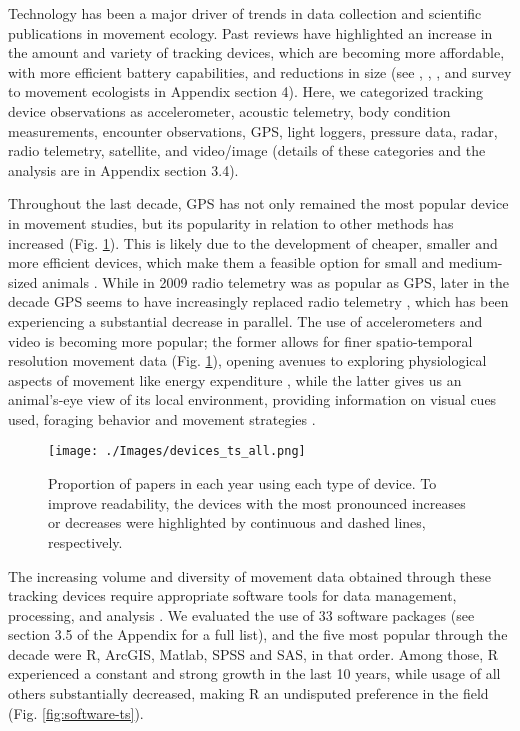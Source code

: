\documentclass[a4paper,12pt]{article}
\begin{document}
Technology has been a major driver of trends in data collection and
scientific publications in movement ecology. Past reviews have
highlighted an increase in the amount and variety of tracking devices,
which are becoming more affordable, with more efficient battery
capabilities, and reductions in size (see \cite{Thums2018}, \cite{Kays2015}, \cite{Harcourt2019}, and survey to
movement ecologists in Appendix section 4). Here, we categorized
tracking device observations as accelerometer, acoustic telemetry, body
condition measurements, encounter observations, GPS, light loggers,
pressure data, radar, radio telemetry, satellite, and video/image
(details of these categories and the analysis are in Appendix section
3.4).

Throughout the last decade, GPS has not only remained the most popular
device in movement studies, but its popularity in relation to other
methods has increased (Fig. \ref{fig:devices-ts}). This is likely due to
the development of cheaper, smaller and more efficient devices, which
make them a feasible option for small and medium-sized animals \cite{Kays2015}.
While in 2009 radio telemetry was as popular as GPS, later in the decade
GPS seems to have increasingly replaced radio telemetry \cite{Allan2018}, which has
been experiencing a substantial decrease in parallel. The use of
accelerometers and video is becoming more popular; the former allows for
finer spatio-temporal resolution movement data (Fig.
\ref{fig:devices-ts}), opening avenues to exploring physiological
aspects of movement like energy expenditure \cite{Wilson2019}, while the latter gives
us an animal's-eye view of its local environment, providing information
on visual cues used, foraging behavior and movement strategies \cite{Thiebault2014,Kane2015}.

\begin{figure}
	\texttt{[image: ./Images/devices\_ts\_all.png]}
	\caption{Proportion of papers in each year using each type of
		device. To improve readability, the devices with the most pronounced increases or decreases were highlighted by continuous and dashed lines, respectively.}
	\label{fig:devices-ts}
\end{figure}

The increasing volume and diversity of movement data obtained through
these tracking devices require appropriate software tools for data
management, processing, and analysis \cite{Urbano2010,Joo2020}. We evaluated the use of
33 software packages (see section 3.5 of the Appendix for a full list),
and the five most popular through the decade were R, ArcGIS, Matlab,
SPSS and SAS, in that order. Among those, R experienced a constant and
strong growth in the last 10 years, while usage of all others
substantially decreased, making R an undisputed preference in the field
(Fig. \ref{fig:software-ts}).
\end{document}
